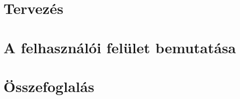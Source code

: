 \documentclass[12pt]{report}
\begin{document}
\chapter{Tervezés}




%


\chapter{A felhasználói felület bemutatása}


\chapter{Összefoglalás}






%
\end{document}
